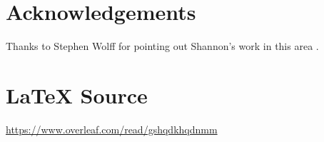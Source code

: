 \documentclass[11pt, oneside]{article}
\theoremstyle{definition}
\begin{document}
\section*{Acknowledgements}
Thanks to Stephen Wolff for pointing out Shannon's work 
in this area \cite{shannon_thesis,the_shannonizer}.
%
%
\section*{\LaTeX \hspace{0.10 mm} Source}
\url{https://www.overleaf.com/read/gshqdkhqdnmm}
%
%
%


%
%
\end{document}
